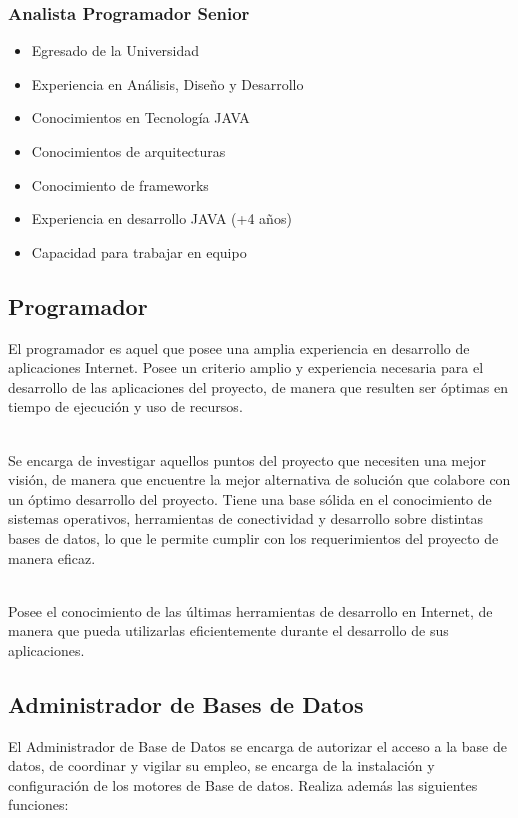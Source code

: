 		\subsubsection{Analista Programador Senior}
			\begin{itemize}
				\item Egresado de la Universidad
				\item Experiencia en Análisis, Diseño y Desarrollo
				\item Conocimientos en Tecnología JAVA
				\item Conocimientos de arquitecturas
				\item Conocimiento de frameworks
				\item Experiencia en desarrollo JAVA (+4 años)
				\item Capacidad para trabajar en equipo
			\end{itemize}		
	
	\subsection{Programador}
		El programador es aquel que posee una amplia experiencia en desarrollo de
		aplicaciones Internet. Posee un criterio amplio y experiencia necesaria para
		el desarrollo de las aplicaciones del proyecto, de manera que resulten ser
		óptimas en tiempo de ejecución y uso de recursos.\\\
		
		Se encarga de investigar aquellos puntos del proyecto que necesiten una mejor
		visión, de manera que encuentre la mejor alternativa de solución que colabore
		con un óptimo desarrollo del proyecto. Tiene una base sólida en el
		conocimiento de sistemas operativos, herramientas de conectividad y
		desarrollo sobre distintas bases de datos, lo que le permite cumplir con los
		requerimientos del proyecto de manera eficaz.\\\
		
		Posee el conocimiento de las últimas herramientas de desarrollo en Internet,
		de manera que pueda utilizarlas eficientemente durante el desarrollo de sus
		aplicaciones.
		
	\subsection{Administrador de Bases de Datos}
		El Administrador de Base de Datos se encarga de autorizar el acceso a
		la base de datos, de coordinar y vigilar su empleo, se encarga de la
		instalación y configuración de los motores de Base de datos. Realiza además
		las siguientes funciones:
		
